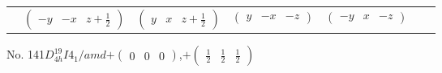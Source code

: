 \documentclass[fleqn,9pt,landscape]{jsarticle}
\begin{document}
\begin{center}
\begin{longtable}{ccccccc}
& $ \begin{pmatrix} - y & - x & z + \frac{1}{2} \end{pmatrix} $ & $ \begin{pmatrix} y & x & z + \frac{1}{2} \end{pmatrix} $ & $ \begin{pmatrix} y & - x & - z \end{pmatrix} $ & $ \begin{pmatrix} - y & x & - z \end{pmatrix} $ & $  $ & $  $ \\
\end{longtable}
\end{center}
\newpage
No. 141\quad$D_{4h}^{19}$\quad$I4_1/amd$\quad[ tetragonal ]\quad$+\begin{pmatrix} 0 & 0 & 0 \end{pmatrix}$,\quad $+\begin{pmatrix} \frac{1}{2} & \frac{1}{2} & \frac{1}{2} \end{pmatrix}$
\end{document}
